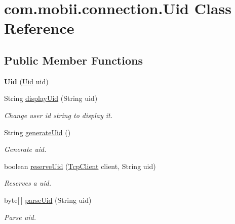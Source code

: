 \hypertarget{classcom_1_1mobii_1_1connection_1_1_uid}{\section{com.\-mobii.\-connection.\-Uid Class Reference}
\label{classcom_1_1mobii_1_1connection_1_1_uid}
}
\subsection*{Public Member Functions}
\begin{DoxyCompactItemize}
\item 
\hypertarget{classcom_1_1mobii_1_1connection_1_1_uid_ac58a45e58d9288474f8ea2342d988747}{{\bfseries Uid} (\hyperlink{classcom_1_1mobii_1_1connection_1_1_uid}{Uid} uid)}\label{classcom_1_1mobii_1_1connection_1_1_uid_ac58a45e58d9288474f8ea2342d988747}

\item 
String \hyperlink{classcom_1_1mobii_1_1connection_1_1_uid_a82ff84b2e43d812eb45b48d3b543b79b}{display\-Uid} (String uid)
\begin{DoxyCompactList}\small\item\em Change user id string to display it. \end{DoxyCompactList}\item 
String \hyperlink{classcom_1_1mobii_1_1connection_1_1_uid_ae54ca4783fc1070b45e38fb50a7c8c79}{generate\-Uid} ()
\begin{DoxyCompactList}\small\item\em Generate uid. \end{DoxyCompactList}\item 
boolean \hyperlink{classcom_1_1mobii_1_1connection_1_1_uid_a2b6b810c93d7b530d609ca3565880304}{reserve\-Uid} (\hyperlink{classcom_1_1mobii_1_1connection_1_1_tcp_client}{Tcp\-Client} client, String uid)
\begin{DoxyCompactList}\small\item\em Reserves a uid. \end{DoxyCompactList}\item 
byte\mbox{[}$\,$\mbox{]} \hyperlink{classcom_1_1mobii_1_1connection_1_1_uid_aca2a1e0475545ec4d99a9f0b821ca7b6}{parse\-Uid} (String uid)
\begin{DoxyCompactList}\small\item\em Parse uid. \end{DoxyCompactList}\end{DoxyCompactItemize}
